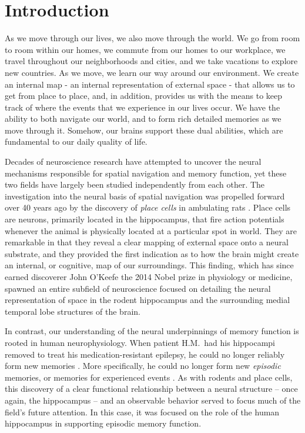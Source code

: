 \chapter{Introduction}


%
%
%

As we move through our lives, we also move through the world. We go from room to room within our homes, we commute from our homes to our workplace, we travel throughout our neighborhoods and cities, and we take vacations to explore new countries. As we move, we learn our way around our environment. We create an internal map - an internal representation of external space - that allows us to get from place to place, and, in addition, provides us with the means to keep track of where the events that we experience in our lives occur. We have the ability to both navigate our world, and to form rich detailed memories as we move through it. Somehow, our brains support these dual abilities, which are fundamental to our daily quality of life.

Decades of neuroscience research have attempted to uncover the neural mechanisms responsible for spatial navigation and memory function, yet these two fields have largely been studied independently from each other. The investigation into the neural basis of spatial navigation was propelled forward over 40 years ago by the discovery of \textit{place cells} in ambulating rats \citep{OKeeDost71}. Place cells are neurons, primarily located in the hippocampus, that fire action potentials whenever the animal is physically located at a particular spot in world. They are remarkable in that they reveal a clear mapping of external space onto a neural substrate, and they provided the first indication as to how the brain might create an internal, or cognitive, map of our surroundings. This finding, which has since earned discoverer John O'Keefe the 2014 Nobel prize in physiology or medicine, spawned an entire subfield of neuroscience focused on detailing the neural representation of space in the rodent hippocampus and the surrounding medial temporal lobe structures of the brain.

In contrast, our understanding of the neural underpinnings of memory function is rooted in human neurophysiology. When patient H.M.\ had his hippocampi removed to treat his medication-resistant epilepsy, he could no longer reliably form new memories \citep{ScovMiln57}. More specifically, he could no longer form new \textit{episodic} memories, or memories for experienced events \citep{Tulv72}. As with rodents and  place cells, this discovery of a clear functional relationship between a neural structure -- once again, the hippocampus -- and an observable behavior served to focus much of the field's future attention. In this case, it was focused on the role of the human hippocampus in supporting episodic memory function.

